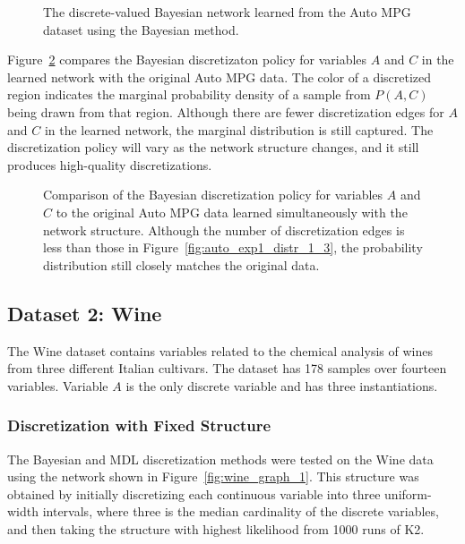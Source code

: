 \documentclass[twoside,11pt]{article}
\begin{document}
\begin{figure}[ht]
  \centering
  \scalebox{0.9}{
  }
  \caption{The discrete-valued Bayesian network learned from the Auto MPG dataset using the Bayesian method.}
  \label{fig:auto_graph_2}
\end{figure}

Figure~\ref{fig:auto_exp2_distr_1_3} compares the Bayesian discretizaton policy for variables $A$ and $C$ in the learned network with the original Auto MPG data.
The color of a discretized region indicates the marginal probability density of a sample from $P(A,C)$ being drawn from that region.
Although there are fewer discretization edges for $A$ and $C$ in the learned network, the marginal distribution is still captured.
The discretization policy will vary as the network structure changes, and it still produces high-quality discretizations.

\begin{figure}[ht]
  \centering
  
  \caption{
    Comparison of the Bayesian discretization policy for variables $A$ and $C$ to the original Auto MPG data learned simultaneously with the network structure.
    Although the number of discretization edges is less than those in Figure~\ref{fig:auto_exp1_distr_1_3}, the probability distribution still closely matches the original data.
  }
  \label{fig:auto_exp2_distr_1_3}
\end{figure}

%
\subsection{Dataset 2: Wine}
\label{subsec:wine}

The Wine dataset contains variables related to the chemical analysis of wines from three different Italian cultivars.
The dataset has \num{178} samples over fourteen variables.
Variable $A$ is the only discrete variable and has three instantiations.

\subsubsection{Discretization with Fixed Structure}
\label{subsubsec:wine_exp1}

The Bayesian and MDL discretization methods were tested on the Wine data using the network shown in Figure~\ref{fig:wine_graph_1}.
This structure was obtained by initially discretizing each continuous variable into three uniform-width intervals, where three is the median cardinality of the discrete variables, and then taking the structure with highest likelihood from \num{1000} runs of K2.
\end{document}

